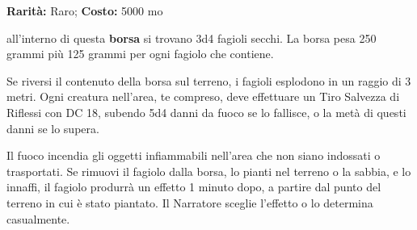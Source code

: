 \begin{multicols}{2}

\textbf{Rarità:} Raro; \textbf{Costo:} 5000 mo

all'interno di questa \textbf{borsa} si trovano 3d4 fagioli secchi. La borsa pesa 250 grammi più 125 grammi per ogni fagiolo che contiene.

Se riversi il contenuto della borsa sul terreno, i fagioli esplodono in un raggio di 3 metri. Ogni creatura nell'area, te compreso, deve effettuare un Tiro Salvezza di Riflessi con DC 18, subendo 5d4 danni da fuoco se lo fallisce, o la metà di questi danni se lo supera.

Il fuoco incendia gli oggetti infiammabili nell'area che non siano indossati o trasportati. Se rimuovi il fagiolo dalla borsa, lo pianti nel terreno o la sabbia, e lo innaffi, il fagiolo produrrà un effetto 1 minuto dopo, a partire dal punto del terreno in cui è stato piantato. Il Narratore sceglie l'effetto o lo determina casualmente.

\medskip


\end{multicols}
